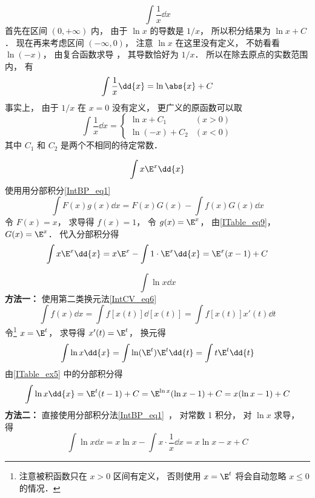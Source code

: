 \begin{example}{}\label{ITable_ex11}
\begin{equation}
\int \frac1x \dd{x}
\end{equation}
首先在区间 $(0,+\infty)$ 内， 由于 $\ln x$ 的导数是 $1/x$， 所以积分结果为 $\ln x + C$． 现在再来考虑区间 $(-\infty, 0)$， 注意 $\ln x$ 在这里没有定义， 不妨看看 $\ln(-x)$， 由复合函数求导%
， 其导数恰好为 $1/x$． 所以在除去原点的实数范围内， 有
\begin{equation}
\int \frac1x \dd{x} = \ln\abs{x} + C
\end{equation}
事实上， 由于 $1/x$ 在 $x=0$ 没有定义， 更广义的原函数可以取
\begin{equation}
\int \frac1x \dd{x} =
\begin{cases}
\ln x + C_1 & (x > 0)\\
\ln (-x) + C_2 & (x < 0)
\end{cases}
\end{equation}
其中 $C_1$ 和 $C_2$ 是两个不相同的待定常数．
\end{example}

\begin{example}{}\label{ITable_ex5}
\begin{equation}
\int x\E^x \dd{x}
\end{equation}
使用用分部积分\autoref{IntBP_eq1}~
\begin{equation}
\int F(x)g(x) \dd{x}  = F(x)G(x) - \int f(x)G(x) \dd{x}
\end{equation}
令 $F(x) = x$， 求导得 $f(x) = 1$， 令 $g(x) = \E^x$， 由\autoref{ITable_eq9}， $G(x) = \E^x$． 代入分部积分得
\begin{equation}
\int x\E^x \dd{x} = x\E^x - \int 1\cdot \E^x \dd{x} = \E^x(x - 1) + C
\end{equation}
\end{example}

\begin{example}{}\label{ITable_ex6}
\begin{equation}
\int \ln x \dd{x}
\end{equation}
\textbf{方法一：} 使用第二类换元法\autoref{IntCV_eq6}~
\begin{equation}
\int f(x) \dd{x} = \int f[x(t)] \dd{[x(t)]} = \int f[x(t)]x'(t) \dd{t}
\end{equation}
令\footnote{注意被积函数只在 $x>0$ 区间有定义， 否则使用 $x = \E^t$ 将会自动忽略 $x\leqslant 0$ 的情况．} $x = \E^t$， 求导得 $x'(t) = \E^t$， 换元得
\begin{equation}
\int \ln x \dd{x} = \int \ln(\E^t) \E^t  \dd{t} = \int t \E^t  \dd{t}
\end{equation}
由\autoref{ITable_ex5} 中的分部积分得
\begin{equation}
\int \ln x \dd{x} = \E^t (t-1) + C = \E^{\ln x} (\ln x -1) + C = x (\ln x-1) + C
\end{equation}
\textbf{方法二：} 直接使用分部积分法\autoref{IntBP_eq1}~， 对常数 1 积分， 对 $\ln x$ 求导， 得
\begin{equation}
\int \ln x \dd{x} = x\ln x - \int x\cdot \frac1x \dd{x} = x\ln x - x + C
\end{equation}
\end{example}

